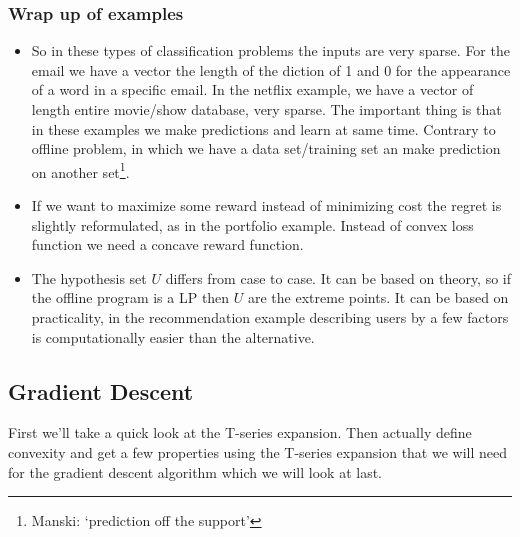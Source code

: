 \documentclass[11pt]{article}
\theoremstyle{quest}
\begin{document}
\subsubsection{Wrap up of examples} 
\begin{itemize}
	\item So in these types of classification problems the inputs are very sparse. For the email we have a vector the length of the diction of 1 and 0 for the appearance of a word in a specific email. In the netflix example, we have a vector of length entire movie/show database, very sparse. The important thing is that in these examples we make predictions and learn at same time. Contrary to offline problem, in which we have a data set/training set an make prediction on another set\footnote{Manski: `prediction off the support'}.
	\item If we want to maximize some reward instead of minimizing cost the regret is slightly reformulated, as in the portfolio example. Instead of convex loss function we need a concave reward function.
	\item The hypothesis set $U$ differs from case to case. It can be based on theory, so if the offline program is a LP then $U$ are the extreme points. It can be based on practicality, in the recommendation example describing users by a few factors is computationally easier than the alternative. 
\end{itemize}
\subsection{Gradient Descent}
 First we'll take a quick look at the T-series expansion. Then actually define convexity and get a few properties using the T-series expansion that we will need for the gradient descent algorithm which we will look at last. 
\end{document}
